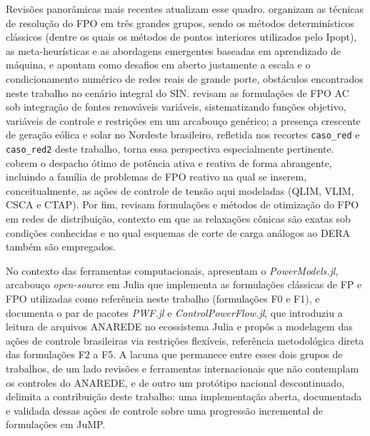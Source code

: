 Revisões panorâmicas mais recentes atualizam esse quadro.  organizam as técnicas de resolução do FPO em três grandes grupos, sendo os métodos determinísticos clássicos (dentre os quais os métodos de pontos interiores utilizados pelo Ipopt), as meta-heurísticas e as abordagens emergentes baseadas em aprendizado de máquina, e apontam como desafios em aberto justamente a escala e o condicionamento numérico de redes reais de grande porte, obstáculos encontrados neste trabalho no cenário integral do SIN.  revisam as formulações de FPO AC sob integração de fontes renováveis variáveis, sistematizando funções objetivo, variáveis de controle e restrições em um arcabouço genérico; a presença crescente de geração eólica e solar no Nordeste brasileiro, refletida nos recortes \texttt{caso\_red} e \texttt{caso\_red2} deste trabalho, torna essa perspectiva especialmente pertinente.  cobrem o despacho ótimo de potência ativa e reativa de forma abrangente, incluindo a família de problemas de FPO reativo na qual se inserem, conceitualmente, as ações de controle de tensão aqui modeladas (QLIM, VLIM, CSCA e CTAP). Por fim,  revisam formulações e métodos de otimização do FPO em redes de distribuição, contexto em que as relaxações cônicas são exatas sob condições conhecidas e no qual esquemas de corte de carga análogos ao DERA também são empregados.

No contexto das ferramentas computacionais,  apresentam o \textit{PowerModels.jl}, arcabouço \textit{open-source} em Julia que implementa as formulações clássicas de FP e FPO utilizadas como referência neste trabalho (formulações F0 e F1), e  documenta o par de pacotes \textit{PWF.jl} e \textit{ControlPowerFlow.jl}, que introduziu a leitura de arquivos ANAREDE no ecossistema Julia e propôs a modelagem das ações de controle brasileiras via restrições flexíveis, referência metodológica direta das formulações F2 a F5. A lacuna que permanece entre esses dois grupos de trabalhos, de um lado revisões e ferramentas internacionais que não contemplam os controles do ANAREDE, e de outro um protótipo nacional descontinuado, delimita a contribuição deste trabalho: uma implementação aberta, documentada e validada dessas ações de controle sobre uma progressão incremental de formulações em JuMP.
